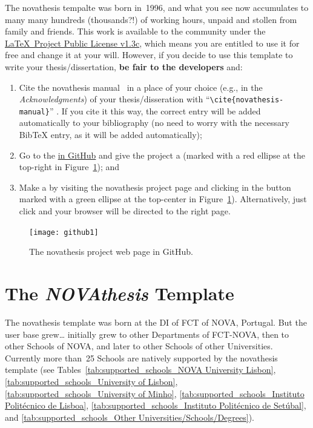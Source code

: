 \ntindex[Recognition]{}

The \gls{novathesis} tempalte was born in~1996, and what you see now accumulates to many many hundreds (thousands?!) of working hours, unpaid and stollen from family and friends.  This work is available to the community under the \href{LaTeX project public license}{\LaTeX\ Project Public License v1.3c}, which means you are entitled to use it for free and change it at your will.  However, if you decide to use this template to write your thesis/dissertation, \textbf{be fair to the developers} and:
\begin{enumerate}
  \item {} Cite the \gls{novathesis} manual~\cite{novathesis-manual} in a place of your choice (e.g., in the \emph{Acknowledgments}) of your thesis/disseration with “\verb!\cite{novathesis-manual}!” .  If you cite it this way, the correct entry will be added automatically to your bibliography (no need to worry with the necessary BibTeX entry, as it will be added automatically);
  \item Go to the
\href{https://github.com/joaomlourenco/novathesis}{ in GitHub} and give the project a  (marked with a red ellipse at the top-right in Figure~\ref{fig:github}); and
  \item Make a  by visiting the \gls{novathesis} project page and clicking in the button marked with a green ellipse at the top-center in Figure~\ref{fig:github}).  Alternatively, just click \href{https://www.paypal.com/donate/?hosted_button_id=8WA8FRVMB78W8}{} and your browser will be directed to the right page.
\end{enumerate}

\begin{figure}[htbp]
  \centering
    \texttt{[image: github1]}
  \caption{The \gls{novathesis} project web page in GitHub.}
  \label{fig:github}
\end{figure}

\section{The \emph{NOVAthesis} Template}
\label{sec:a_bit_of_history}

\ntindex[Template]{}

The \gls{novathesis} template was born at the \gls{DI} of  \gls{FCT} of \gls{NOVA}, Portugal.  But the user base grew… initially grew to other Departments of FCT-NOVA, then to other Schools of NOVA, and later to other Schools of other Universities.  Currently more than~25 Schools are natively supported by the \gls{novathesis} template (see Tables~\ref{tab:supported_schools_NOVA University Lisbon}, \ref{tab:supported_schools_University of Lisbon}, \ref{tab:supported_schools_University of Minho}, \ref{tab:supported_schools_Instituto Politécnico de Lisboa}, \ref{tab:supported_schools_Instituto Politécnico de Setúbal}, and \ref{tab:supported_schools_Other Universities/Schools/Degrees}).

